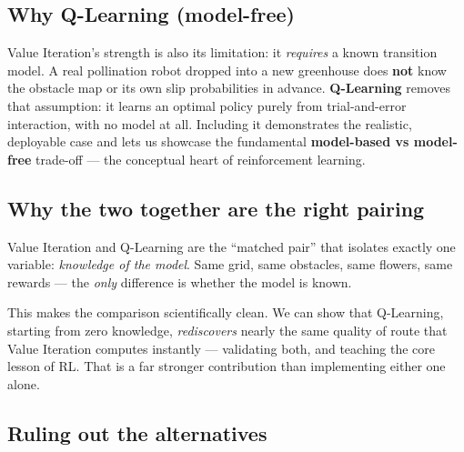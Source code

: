 \documentclass[11pt]{article}
\begin{document}
\subsection{Why Q-Learning (model-free)}
\begin{rebut}
Value Iteration's strength is also its limitation: it \emph{requires} a known
transition model. A real pollination robot dropped into a new greenhouse does
\textbf{not} know the obstacle map or its own slip probabilities in advance.
\textbf{Q-Learning} removes that assumption: it learns an optimal policy purely
from trial-and-error interaction, with no model at all. Including it demonstrates
the realistic, deployable case and lets us showcase the fundamental
\textbf{model-based vs model-free} trade-off --- the conceptual heart of
reinforcement learning.
\end{rebut}

\subsection{Why the two together are the right pairing}
\begin{claim}
Value Iteration and Q-Learning are the ``matched pair'' that isolates exactly one
variable: \emph{knowledge of the model}. Same grid, same obstacles, same
flowers, same rewards --- the \emph{only} difference is whether the model is
known.
\end{claim}
\begin{rebut}
This makes the comparison scientifically clean. We can show that Q-Learning,
starting from zero knowledge, \emph{rediscovers} nearly the same quality of route
that Value Iteration computes instantly --- validating both, and teaching the
core lesson of RL. That is a far stronger contribution than implementing either
one alone.
\end{rebut}

\subsection{Ruling out the alternatives}
\end{document}
